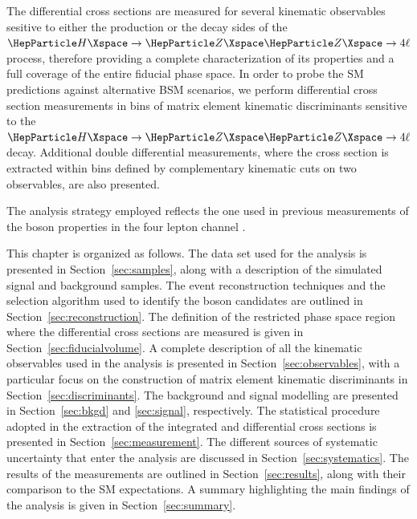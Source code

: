 The differential cross sections are measured for several kinematic observables sesitive to either the production or the decay sides of the $\HZZfl$ process, therefore providing a complete characterization of its properties and a full coverage of the entire fiducial phase space.
In order to probe the SM predictions against alternative BSM scenarios, we perform differential cross section measurements in bins of matrix element kinematic discriminants sensitive to the $\HZZfl$ decay.
Additional double differential measurements, where the cross section is extracted within bins defined by complementary kinematic cuts on two observables, are also presented. 

The analysis strategy employed reflects the one used in previous measurements of the \PH boson properties in the four lepton channel \cite{CMSH4lFiducial8TeV, CMSHIG19001}.

This chapter is organized as follows. 
The data set used for the analysis is presented in Section~\ref{sec:samples}, along with a description of the simulated signal and background samples.
The event reconstruction techniques and the selection algorithm used to identify the \PH boson candidates are outlined in Section~\ref{sec:reconstruction}.
The definition of the restricted phase space region where the differential cross sections are measured is given in Section~\ref{sec:fiducialvolume}.
A complete description of all the kinematic observables used in the analysis is presented in Section~\ref{sec:observables}, with a particular focus on the construction of matrix element kinematic discriminants in Section~\ref{sec:discriminants}.
The background and signal modelling are presented in Section~\ref{sec:bkgd} and \ref{sec:signal}, respectively.
The statistical procedure adopted in the extraction of the integrated and differential cross sections is presented in Section~\ref{sec:measurement}. 
The different sources of systematic uncertainty that enter the analysis are discussed in Section~\ref{sec:systematics}.
The results of the measurements are outlined in Section~\ref{sec:results}, along with their comparison to the SM expectations.
A summary highlighting the main findings of the analysis is given in Section~\ref{sec:summary}.

